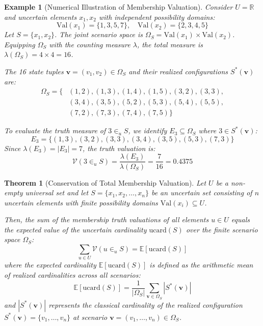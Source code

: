 \documentclass[a4paper,14pt, twoside]{memoir}
\newtheorem{theorem}{Theorem}[chapter]
\newtheorem{example}{Example}[chapter]
\begin{document}
	\begin{example}[Numerical Illustration of Membership Valuation]
		Consider $U = \mathbb{R}$ and uncertain elements $x_1, x_2$ with independent possibility domains:
		\[
		\mathrm{Val}(x_1) = \{1, 3, 5, 7\}, \quad \mathrm{Val}(x_2) = \{2, 3, 4, 5\}
		\]
		Let $S = \{x_1, x_2\}$. The joint scenario space is $\Omega_S = \mathrm{Val}(x_1) \times \mathrm{Val}(x_2)$. Equipping $\Omega_S$ with the counting measure $\lambda$, the total measure is $\lambda(\Omega_S) = 4 \times 4 = 16$.
		
		The 16 state tuples $\mathbf{v} = (v_1, v_2) \in \Omega_S$ and their realized configurations $S^*(\mathbf{v})$ are:
		\begin{align*}
			\Omega_S = \{ &(1,2), (1,3), (1,4), (1,5), (3,2), (3,3), \\
			&(3,4), (3,5), (5,2), (5,3), (5,4), (5,5), \\
			&(7,2), (7,3), (7,4), (7,5) \}
		\end{align*}
		
		To evaluate the truth measure of $3 \in_u S$, we identify $E_3 \subseteq \Omega_S$ where $3 \in S^*(\mathbf{v})$:
		\[
		E_3 = \{(1,3), (3,2), (3,3), (3,4), (3,5), (5,3), (7,3)\}
		\]
		Since $\lambda(E_3) = |E_3| = 7$, the truth valuation is:
		\[
		\mathcal{V}(3 \in_u S) = \frac{\lambda(E_3)}{\lambda(\Omega_S)} = \frac{7}{16} = 0.4375
		\]
	\end{example}
	
	\begin{theorem}[Conservation of Total Membership Valuation]
		Let $U$ be a non-empty universal set and let $S = \{x_1, x_2, \dots, x_n\}$ be an uncertain set consisting of $n$ uncertain elements with finite possibility domains $\mathrm{Val}(x_i) \subseteq U$.
		
		Then, the sum of the membership truth valuations of all elements $u \in U$ equals the expected value of the uncertain cardinality $\mathrm{ucard}(S)$ over the finite scenario space $\Omega_S$:
		\[
		\sum_{u \in U} \mathcal{V}(u \in_u S) = \mathbb{E}\left[\mathrm{ucard}(S)\right]
		\]
		where the expected cardinality $\mathbb{E}\left[\mathrm{ucard}(S)\right]$ is defined as the arithmetic mean of realized cardinalities across all scenarios:
		\[
		\mathbb{E}\left[\mathrm{ucard}(S)\right] = \frac{1}{|\Omega_S|} \sum_{\mathbf{v} \in \Omega_S} |S^*(\mathbf{v})|
		\]
		and $|S^*(\mathbf{v})|$ represents the classical cardinality of the realized configuration $S^*(\mathbf{v}) = \{v_1, \dots, v_n\}$ at scenario $\mathbf{v} = (v_1, \dots, v_n) \in \Omega_S$.
	\end{theorem}
	
\end{document}
